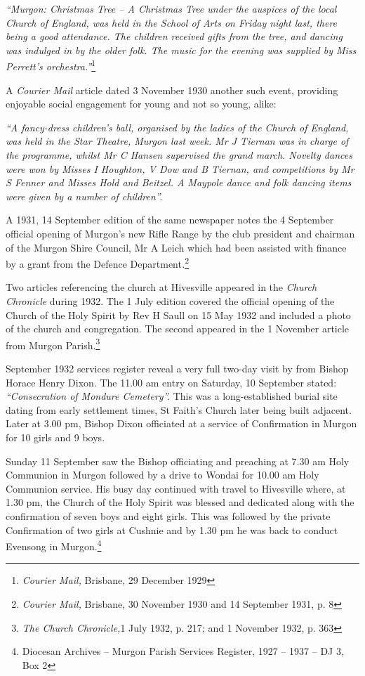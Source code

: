 \emph{``Murgon: Christmas Tree -- A Christmas Tree under the auspices of the local Church of England, was held in the School of Arts on Friday night last, there being a good attendance. The children received gifts from the tree, and dancing was indulged in by the older folk. The music for the evening was supplied by Miss Perrett's orchestra.''}\footnote{\emph{Courier Mail,} Brisbane, 29 December 1929}


A \emph{Courier Mail} article dated 3 November 1930 another such event, providing enjoyable social engagement for young and not so young, alike:



\emph{``A fancy-dress children's ball, organised by the ladies of the Church of England, was held in the Star Theatre, Murgon last week. Mr J Tiernan was in charge of the programme, whilst Mr C Hansen supervised the grand march. Novelty dances were won by Misses I Houghton, V Dow and B Tiernan, and competitions by Mr S Fenner and Misses Hold and Beitzel. A Maypole dance and folk dancing items were given by a number of children''.}



A 1931, 14 September edition of the same newspaper notes the 4 September official opening of Murgon's new Rifle Range by the club president and chairman of the Murgon Shire Council, Mr A Leich which had been assisted with finance by a grant from the Defence Department\emph{.}\footnote{\emph{Courier Mail,} Brisbane, 30 November 1930 and 14 September 1931, p. 8}


Two articles referencing the church at Hivesville appeared in the \emph{Church Chronicle} during 1932. The 1 July edition covered the official opening of the Church of the Holy Spirit by Rev H Saull on 15 May 1932 and included a photo of the church and congregation. The second appeared in the 1 November article from Murgon Parish.\footnote{\emph{The Church Chronicle,}1 July 1932, p. 217; and 1 November 1932, p. 363}


September 1932 services register reveal a very full two-day visit by from Bishop Horace Henry Dixon. The 11.00 am entry on Saturday, 10 September stated: \emph{``Consecration of Mondure Cemetery''.} This was a long-established burial site dating from early settlement times, St Faith's Church later being built adjacent. Later at 3.00 pm, Bishop Dixon officiated at a service of Confirmation in Murgon for 10 girls and 9 boys.



Sunday 11 September saw the Bishop officiating and preaching at 7.30 am Holy Communion in Murgon followed by a drive to Wondai for 10.00 am Holy Communion service. His busy day continued with travel to Hivesville where, at 1.30 pm, the Church of the Holy Spirit was blessed and dedicated along with the confirmation of seven boys and eight girls. This was followed by the private Confirmation of two girls at Cushnie and by 1.30 pm he was back to conduct Evensong in Murgon.\footnote{Diocesan Archives -- Murgon Parish Services Register, 1927 -- 1937 -- DJ 3, Box 2}


